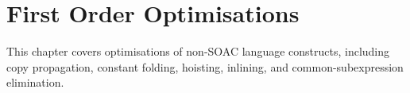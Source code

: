 \chapter{First Order Optimisations}
\label{chap:first-order-optimisations}

This chapter covers optimisations of non-SOAC language constructs,
including copy propagation, constant folding, hoisting, inlining, and
common-subexpression elimination.

